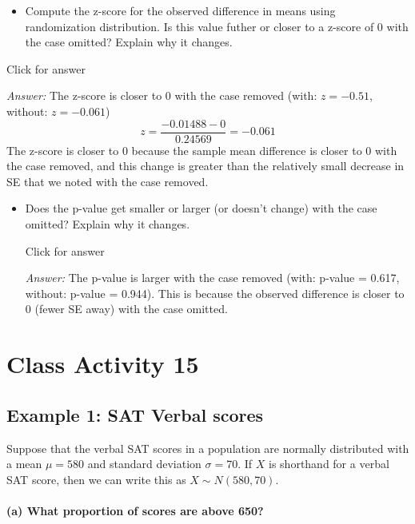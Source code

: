 \documentclass[
]{book}
\providecommand{\tightlist}{%
  \setlength{\itemsep}{0pt}\setlength{\parskip}{0pt}}
\begin{document}
\vspace*{.5in}

\begin{itemize}
\tightlist
\item
  Compute the z-score for the observed difference in means using randomization distribution. Is this value futher or closer to a z-score of 0 with the case omitted? Explain why it changes.
\end{itemize}

Click for answer

\emph{Answer:} The z-score is closer to 0 with the case removed (with: \(z = -0.51\), without: \(z = -0.061\))
\[
z = \dfrac{-0.01488  - 0}{0.24569} = -0.061
\]
The z-score is closer to 0 because the sample mean difference is closer to 0 with the case removed, and this change is greater than the relatively small decrease in SE that we noted with the case removed.

\vspace*{.5in}

\begin{itemize}
\tightlist
\item
  Does the p-value get smaller or larger (or doesn't change) with the case omitted? Explain why it changes.

  Click for answer

  \emph{Answer:} The p-value is larger with the case removed (with: p-value = 0.617, without: p-value = 0.944). This is because the observed difference is closer to 0 (fewer SE away) with the case omitted.
\end{itemize}

\hypertarget{class-activity-15}{%
\chapter{Class Activity 15}\label{class-activity-15}}

\hypertarget{example-1-sat-verbal-scores}{%
\section{Example 1: SAT Verbal scores}\label{example-1-sat-verbal-scores}}

Suppose that the verbal SAT scores in a population are normally distributed with a mean \(\mu=580\) and standard deviation \(\sigma = 70\). If \(X\) is shorthand for a verbal SAT score, then we can write this as \(X \sim N(580,70)\).

\hypertarget{a-what-proportion-of-scores-are-above-650}{%
\subsubsection{(a) What proportion of scores are above 650?}\label{a-what-proportion-of-scores-are-above-650}}
\end{document}
